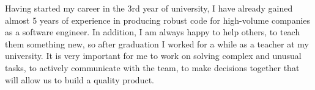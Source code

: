 Having started my career in the 3rd year of university, I have already gained almost 5 years of experience in producing robust code for high-volume companies as a software engineer.  In addition, I am always happy to help others, to teach them something new, so after graduation I worked for a while as a teacher at my university. It is very important for me to work on solving complex and unusual tasks, to actively communicate with the team, to make decisions together that will allow us to build a quality product.